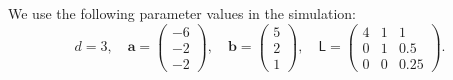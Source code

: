 \documentclass{iitthesis}          %
\newcommand{\bm}[1]{\boldsymbol{#1}}
\newcommand{\va}{\bm{a}}
\newcommand{\vb}{\bm{b}}
\newcommand{\mL}{\mathsf{L}}
\begin{document}
We use the following parameter values in the simulation: 
\begin{equation*}
d = 3, \quad \va = \begin{pmatrix}
-6 \\ -2 \\ -2
\end{pmatrix}, \quad 
\vb = \begin{pmatrix}
5 \\ 2 \\ 1
\end{pmatrix} , \quad 
\mL = \begin{pmatrix}
4 & 1 & 1 \\ 0 & 1 & 0.5 \\ 0 & 0 & 0.25
\end{pmatrix}.
\end{equation*}
\end{document}
